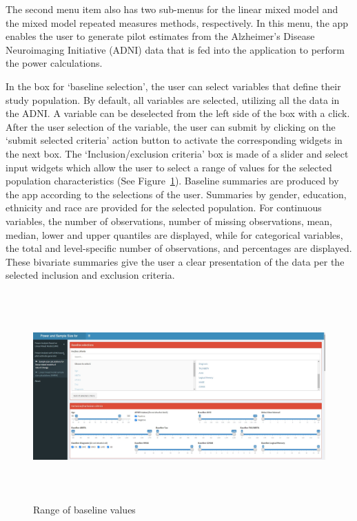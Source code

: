The second menu item also has two sub-menus for the linear mixed model and the mixed model repeated measures methods, respectively. In this menu, the app enables the user to generate pilot estimates from the Alzheimer's Disease Neuroimaging Initiative (ADNI) data that is fed into the application to perform the power calculations. 

In the box for `baseline selection', the user can select variables that define their study population. By default, all variables are selected, utilizing all the data in the ADNI. A variable can be deselected from the left side of the box with a click. After the user selection of the variable, the user can submit by clicking on the `submit selected criteria' action button to activate the corresponding widgets in the next box. The `Inclusion/exclusion criteria' box is made of a slider and select input widgets which allow the user to select a range of values for the selected population characteristics (See Figure~\ref{ADNIbase}). Baseline summaries are produced by the app according to the selections of the user. Summaries by gender, education, ethnicity and race are provided for the selected population. For continuous variables, the number of observations, number of missing observations, mean, median, lower and upper quantiles are displayed, while for categorical variables, the total and level-specific number of observations, and percentages are displayed. These bivariate summaries give the user a clear presentation of the data per the selected inclusion and exclusion criteria. 

\begin{figure}[ht]
	\includegraphics[width=14cm,height=8cm]{./Figures/FigADNIPar.jpg}
	\caption{Range of baseline values}\label{ADNIbase}
\end{figure}

